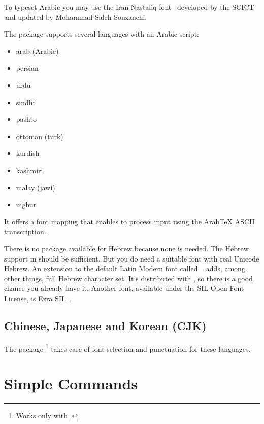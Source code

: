 To typeset Arabic you may use the Iran Nastaliq font~\cite{font:IranNastaliq}
developed by the SCICT and updated by Mohammad Saleh Souzanchi.

The  package supports several languages with
an Arabic script:
\begin{itemize}
  \item arab (Arabic)
  \item persian
  \item urdu
  \item sindhi
  \item pashto
  \item ottoman (turk)
  \item kurdish
  \item kashmiri
  \item malay (jawi)
  \item uighur
\end{itemize}

It offers a font mapping that enables  to process input
using the Arab\TeX{} ASCII transcription.

There is no package available for Hebrew because none is needed.
The Hebrew support in  should be sufficient. But you do need a
suitable font with real Unicode Hebrew. An extension to the default Latin
Modern font called
~\cite{font:NewComputerModern} adds, among
other things, full Hebrew character set. It's distributed with \TeXLive, so
there is a good chance you already have it. Another font, available under the
SIL Open Font License, is Ezra SIL~\cite{font:ezrasil}.

\subsection{Chinese, Japanese and Korean (CJK)}%

The package \footnote{Works only with
  .} takes care of font selection and
punctuation for these languages.

\section{Simple Commands}\label{sec:simple_commands}

